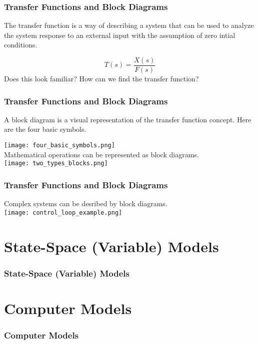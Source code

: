 \documentclass{beamer}                  %
\newcommand{\sectiontitleIII}{Transfer Functions and Block Diagrams}
\newcommand{\sectiontitleIV}{State-Space (Variable) Models}
\newcommand{\sectiontitleV}{Computer Models}
\begin{document}
	\begin{frame}[label=sectionIII] \small
		\frametitle{\sectiontitleIII}
		\vspace{3mm}
		The transfer function is a way of describing a system that can be used to analyze the system response to an external input with the assumption of zero intial conditions.  

			
		\[ T(s)=\frac{X(s)}{F(s)} \]
		\vspace{10mm}
		Does this look familiar? How can we find the transfer function?		

		\btVFill
	\end{frame}	
	
	\begin{frame} \small
		\frametitle{\sectiontitleIII}
		\vspace{3mm}	
		A block diagram is a visual representation of the transfer function concept. Here are the four basic symbols.

		\vspace{5mm}

		\texttt{[image: four\_basic\_symbols.png]} \vspace{2mm}\\

		Mathematical operations can be represented as block diagrams. \vspace{2mm}\\

		\texttt{[image: two\_types\_blocks.png]}

		\btVFill
	\end{frame}	

	\begin{frame} \small
		\frametitle{\sectiontitleIII}

		Complex systems can be desribed by block diagrams. \vspace{5mm} \\
		
		\texttt{[image: control\_loop\_example.png]}

			
	\end{frame}	

\section{\sectiontitleIV}

	\begin{frame}[label=sectionIV] \small
		\frametitle{\sectiontitleIV}
		
	\end{frame}	

\section{\sectiontitleV}

	\begin{frame}[label=sectionV] \small
		\frametitle{\sectiontitleV}
		
	\end{frame}	
\end{document}
